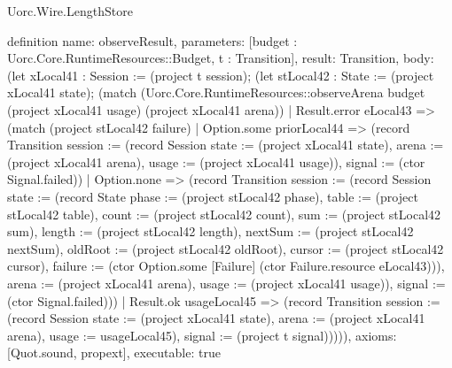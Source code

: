\begin{lexlean}{Uorc.Wire.LengthStore}
\begin{semanticmodule}
definition{
  name: observeResult,
  parameters: [budget : Uorc.Core.RuntimeResources::Budget, t : Transition],
  result: Transition,
  body: (let xLocal41 : Session := (project t session); (let stLocal42 : State := (project xLocal41 state); (match (Uorc.Core.RuntimeResources::observeArena budget (project xLocal41 usage) (project xLocal41 arena))
    | Result.error eLocal43 => (match (project stLocal42 failure)
      | Option.some priorLocal44 => (record Transition {session := (record Session {state := (project xLocal41 state), arena := (project xLocal41 arena), usage := (project xLocal41 usage)}), signal := (ctor Signal.failed)})
      | Option.none => (record Transition {session := (record Session {state := (record State {phase := (project stLocal42 phase), table := (project stLocal42 table), count := (project stLocal42 count), sum := (project stLocal42 sum), length := (project stLocal42 length), nextSum := (project stLocal42 nextSum), oldRoot := (project stLocal42 oldRoot), cursor := (project stLocal42 cursor), failure := (ctor Option.some [Failure] (ctor Failure.resource eLocal43))}), arena := (project xLocal41 arena), usage := (project xLocal41 usage)}), signal := (ctor Signal.failed)}))
    | Result.ok usageLocal45 => (record Transition {session := (record Session {state := (project xLocal41 state), arena := (project xLocal41 arena), usage := usageLocal45}), signal := (project t signal)})))),
  axioms: [Quot.sound, propext],
  executable: true
}


\end{semanticmodule}
\end{lexlean}
